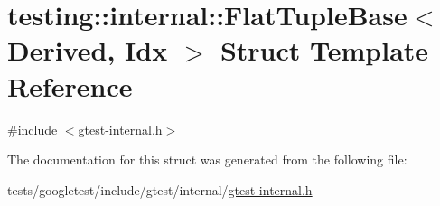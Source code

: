 \hypertarget{structtesting_1_1internal_1_1FlatTupleBase}{}\section{testing\+:\+:internal\+:\+:Flat\+Tuple\+Base$<$ Derived, Idx $>$ Struct Template Reference}
\label{structtesting_1_1internal_1_1FlatTupleBase}


{\ttfamily \#include $<$gtest-\/internal.\+h$>$}



The documentation for this struct was generated from the following file\+:\begin{DoxyCompactItemize}
\item 
tests/googletest/include/gtest/internal/\hyperlink{gtest-internal_8h}{gtest-\/internal.\+h}\end{DoxyCompactItemize}
